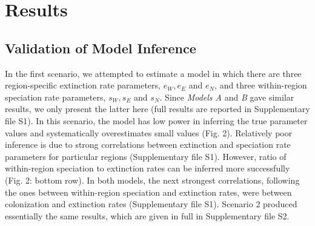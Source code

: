\section*{Results}
\subsection*{Validation of Model Inference}
\noindent In the first scenario, we attempted to estimate a model in which there are three region-specific extinction rate parameters, $e_W,e_E$  and $e_N$, and three within-region speciation rate parameters, $s_W,s_E$  and $s_N$.  
Since \textit{Models A} and \textit{B} gave similar results, we only present the latter here (full results are reported in Supplementary file S1). 
In this scenario, the model has low power in inferring the true parameter values and systematically overestimates small values (Fig. 2). 
Relatively poor inference is due to strong correlations between extinction and speciation rate parameters for particular regions (Supplementary file S1). 
However, ratio of within-region speciation to extinction rates can be inferred more successfully (Fig. 2: bottom row). 
In both models, the next strongest correlations, following the ones between within-region speciation and extinction rates, were between colonization and extinction rates (Supplementary file S1). 
Scenario 2 produced essentially the same results, which are given in full in Supplementary file S2.

